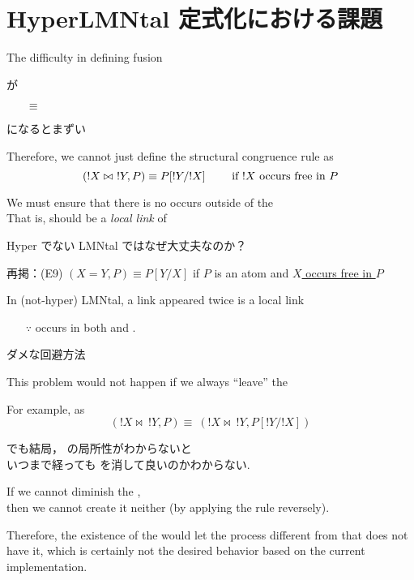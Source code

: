 \section[Problem]{HyperLMNtal 定式化における課題}
\begin{frame}{The difficulty in defining fusion}

  が
  \begin{itemize}
  \item[$\equiv$] 
  \end{itemize}
  になるとまずい
  
  Therefore, we cannot just define the structural congruence rule as  
  \[(!X \bowtie\ !Y, P) \equiv P[!Y/!X]
  \mbox{\hspace{2em} if \(!X\) occurs free in \(P\)}\]
  
  We must ensure that there is no  occurs outside of the \\
  That is,  should be a \emph{local link} of 
\end{frame}

\begin{frame}{Hyper でない LMNtal ではなぜ大丈夫なのか？}

  再掲：(E9)
  $(X = Y, P) \equiv P[Y/X]$
  \hspace{1em}
  if $P$ is an atom and \underline{$X$ occurs free in $P$}

  \vspace{2em}
  
  In (not-hyper) LMNtal, a link appeared twice is a local link
  \begin{itemize}
    \thusitem
    the condition of (E9), \underline{``\textit{if \(X\) occurs free in \(P\)}''}\\
    requires the  to be a local link in 
    \item[\(\because\)]
       occurs in both  and .
  \end{itemize}

\end{frame}

\begin{frame}{ダメな回避方法}

  This problem would not happen if we always ``leave'' the 

  For example, as 
  \[(!X \bowtie\ !Y, P) \equiv\ (!X \bowtie\ !Y, P[!Y/!X]) \]
  
  でも結局， の局所性がわからないと\\
  いつまで経っても  を消して良いのかわからない.

  If we cannot diminish the ,\\
  then we cannot create it neither (by applying the rule reversely).
  
  Therefore, the existence of the  would let the process
  different from that does not have it,
  which is certainly not the desired behavior based on the current implementation.
  
\end{frame}

